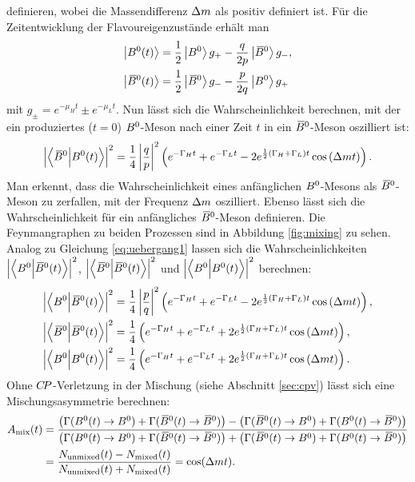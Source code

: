 definieren, wobei die Massendifferenz ${\Delta m}$ als positiv definiert ist. Für die Zeitentwicklung der Flavoureigenzustände erhält man 
\begin{equation}
\begin{split}
\left|{{B}^0}(t)\right>&=\frac{1}{2}\left|{{B}^0}\right>g_+-\frac{q}{2p}\left|{{\kern 0.18em\overline{\kern -0.18em B}{}}{}^0}\right>g_-,\\
\left|{{\kern 0.18em\overline{\kern -0.18em B}{}}{}^0}(t)\right>&=\frac{1}{2}\left|{{\kern 0.18em\overline{\kern -0.18em B}{}}{}^0}\right>g_--\frac{p}{2q}\left|{{B}^0}\right>g_+
\end{split}
\end{equation}
mit $g_\pm=e^{-\mu_Ht}\pm e^{-\mu_Lt}$. Nun lässt sich die Wahrscheinlichkeit berechnen, mit der ein produziertes ($t=0$) ${{B}^0}$-Meson nach einer Zeit $t$ in ein ${{\kern 0.18em\overline{\kern -0.18em B}{}}{}^0}$-Meson oszilliert ist:
\begin{equation}
\left|\left<{{\kern 0.18em\overline{\kern -0.18em B}{}}{}^0}\Big|{{B}^0}(t)\right>\right|^2=\frac{1}{4}\left|\frac{q}{p}\right|^2\left(e^{-\Gamma_Ht}+e^{-\Gamma_Lt}-2e^{\frac{1}{2}\left(\Gamma_H+\Gamma_L\right)t}\cos\left({\Delta m} t\right)\right).\label{eq:uebergang1}
\end{equation}
Man erkennt, dass die Wahrscheinlichkeit eines anfänglichen ${{B}^0}$-Mesons als ${{\kern 0.18em\overline{\kern -0.18em B}{}}{}^0}$-Meson zu zerfallen, mit der Frequenz ${\Delta m}$ oszilliert. Ebenso lässt sich die Wahrscheinlichkeit für ein anfängliches ${{\kern 0.18em\overline{\kern -0.18em B}{}}{}^0}$-Meson definieren. Die Feynmangraphen zu beiden Prozessen sind in Abbildung \ref{fig:mixing} zu sehen.\\
Analog zu Gleichung \eqref{eq:uebergang1} lassen sich die Wahrscheinlichkeiten $\left|\left<{{B}^0}\Big|{{\kern 0.18em\overline{\kern -0.18em B}{}}{}^0}(t)\right>\right|^2$, $\left|\left<{{\kern 0.18em\overline{\kern -0.18em B}{}}{}^0}\Big|{{\kern 0.18em\overline{\kern -0.18em B}{}}{}^0}(t)\right>\right|^2$ und $\left|\left<{{B}^0}\Big|{{B}^0}(t)\right>\right|^2$ berechnen:
\begin{align}
\left|\left<{{B}^0}\Big|{{\kern 0.18em\overline{\kern -0.18em B}{}}{}^0}(t)\right>\right|^2&=\frac{1}{4}\left|\frac{p}{q}\right|^2\left(e^{-\Gamma_Ht}+e^{-\Gamma_Lt}-2e^{\frac{1}{2}\left(\Gamma_H+\Gamma_L\right)t}\cos\left({\Delta m} t\right)\right),\label{eq:uebergang2}\\
\left|\left<{{\kern 0.18em\overline{\kern -0.18em B}{}}{}^0}\Big|{{\kern 0.18em\overline{\kern -0.18em B}{}}{}^0}(t)\right>\right|^2&=\frac{1}{4}\left(e^{-\Gamma_Ht}+e^{-\Gamma_Lt}+2e^{\frac{1}{2}\left(\Gamma_H+\Gamma_L\right)t}\cos\left({\Delta m} t\right)\right),\label{eq:uebergang3}\\
\left|\left<{{B}^0}\Big|{{B}^0}(t)\right>\right|^2&=\frac{1}{4}\left(e^{-\Gamma_Ht}+e^{-\Gamma_Lt}+2e^{\frac{1}{2}\left(\Gamma_H+\Gamma_L\right)t}\cos\left({\Delta m} t\right)\right).\label{eq:uebergang4}
\end{align}
Ohne ${C\!P}$-Verletzung in der Mischung (siehe Abschnitt \ref{sec:cpv}) lässt sich eine Mischungsasymmetrie berechnen:
\begin{equation}
\begin{split}
A_{\text{mix}}(t)&=\frac{\left(\Gamma({{B}^0}(t)\rightarrow{\ensuremath{{B}^0}})+\Gamma({{\kern 0.18em\overline{\kern -0.18em B}{}}{}^0}(t)\rightarrow{\ensuremath{{\kern 0.18em\overline{\kern -0.18em B}{}}{}^0}})\right)-\left(\Gamma({{\kern 0.18em\overline{\kern -0.18em B}{}}{}^0}(t)\rightarrow{\ensuremath{{B}^0}})+\Gamma({{B}^0}(t)\rightarrow{\ensuremath{{\kern 0.18em\overline{\kern -0.18em B}{}}{}^0}})\right)}{\left(\Gamma({{B}^0}(t)\rightarrow{\ensuremath{{B}^0}})+\Gamma({{\kern 0.18em\overline{\kern -0.18em B}{}}{}^0}(t)\rightarrow{\ensuremath{{\kern 0.18em\overline{\kern -0.18em B}{}}{}^0}})\right)+\left(\Gamma({{\kern 0.18em\overline{\kern -0.18em B}{}}{}^0}(t)\rightarrow{\ensuremath{{B}^0}})+\Gamma({{B}^0}(t)\rightarrow{\ensuremath{{\kern 0.18em\overline{\kern -0.18em B}{}}{}^0}})\right)}\\
&=\frac{N_\text{unmixed}(t)-N_\text{mixed}(t)}{N_\text{unmixed}(t)+N_\text{mixed}(t)}=\cos({\Delta m} t).\label{eq:mixing}
\end{split}
\end{equation}
